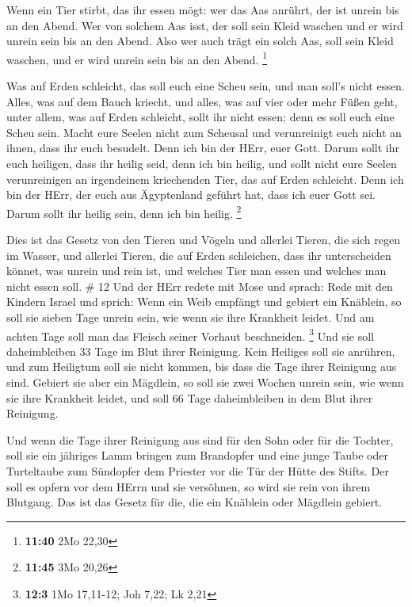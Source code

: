  Wenn ein Tier stirbt, das ihr essen mögt: wer das Aas
anrührt, der ist unrein bis an den Abend.  Wer von solchem
Aas isst, der soll sein Kleid waschen und er wird unrein sein bis an den
Abend. Also wer auch trägt ein solch Aas, soll sein Kleid waschen, und
er wird unrein sein bis an den Abend. \footnote{\textbf{11:40} 2Mo 22,30}

 Was auf Erden schleicht, das soll euch eine Scheu sein,
und man soll's nicht essen.  Alles, was auf dem Bauch
kriecht, und alles, was auf vier oder mehr Füßen geht, unter allem, was
auf Erden schleicht, sollt ihr nicht essen; denn es soll euch eine Scheu
sein.  Macht eure Seelen nicht zum Scheusal und
verunreinigt euch nicht an ihnen, dass ihr euch besudelt. 
Denn ich bin der HErr, euer Gott. Darum sollt ihr euch heiligen, dass
ihr heilig seid, denn ich bin heilig, und sollt nicht eure Seelen
verunreinigen an irgendeinem kriechenden Tier, das auf Erden schleicht.
 Denn ich bin der HErr, der euch aus Ägyptenland geführt
hat, dass ich euer Gott sei. Darum sollt ihr heilig sein, denn ich bin
heilig. \footnote{\textbf{11:45} 3Mo 20,26}

 Dies ist das Gesetz von den Tieren und Vögeln und allerlei
Tieren, die sich regen im Wasser, und allerlei Tieren, die auf Erden
schleichen,  dass ihr unterscheiden könnet, was unrein und
rein ist, und welches Tier man essen und welches man nicht essen soll.
\# 12  Und der HErr redete mit Mose und sprach: 
Rede mit den Kindern Israel und sprich: Wenn ein Weib empfängt und
gebiert ein Knäblein, so soll sie sieben Tage unrein sein, wie wenn sie
ihre Krankheit leidet.  Und am achten Tage soll man das
Fleisch seiner Vorhaut beschneiden. \footnote{\textbf{12:3} 1Mo
  17,11-12; Joh 7,22; Lk 2,21}  Und sie soll daheimbleiben
33 Tage im Blut ihrer Reinigung. Kein Heiliges soll sie anrühren, und
zum Heiligtum soll sie nicht kommen, bis dass die Tage ihrer Reinigung
aus sind.  Gebiert sie aber ein Mägdlein, so soll sie zwei
Wochen unrein sein, wie wenn sie ihre Krankheit leidet, und soll 66 Tage
daheimbleiben in dem Blut ihrer Reinigung.

 Und wenn die Tage ihrer Reinigung aus sind für den Sohn
oder für die Tochter, soll sie ein jähriges Lamm bringen zum Brandopfer
und eine junge Taube oder Turteltaube zum Sündopfer dem Priester vor die
Tür der Hütte des Stifts.  Der soll es opfern vor dem HErrn
und sie versöhnen, so wird sie rein von ihrem Blutgang. Das ist das
Gesetz für die, die ein Knäblein oder Mägdlein gebiert.

